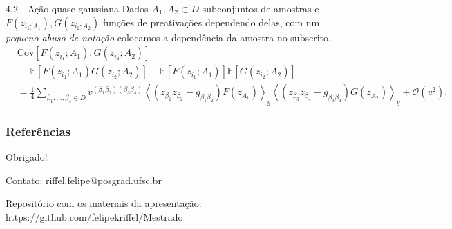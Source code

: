 \documentclass{beamer}
\begin{document}
\begin{frame}{4.2 - Ação quase gaussiana}
    \tiny
    Dados $A_1, A_2 \subset D$ subconjuntos de amostras e $F(z_{i_1;A_1}),G(z_{i_2;A_2})$ funções de preativações dependendo delas, com um \textit{pequeno abuso de notação} colocamos a dependência da amostra no subscrito.
    \begin{align*}
        &\text{Cov}\left[ F(z_{i_1}; A_1), G(z_{i_2}; A_2) \right] \\
        &\equiv \mathbb{E}\left[ F(z_{i_1}; A_1) G(z_{i_2}; A_2) \right] 
        - \mathbb{E}\left[ F(z_{i_1}; A_1) \right] \mathbb{E}\left[ G(z_{i_2}; A_2) \right] \nonumber \\
        &= \frac{1}{4} \sum_{\beta_1, \ldots, \beta_4 \in D} v^{(\beta_1 \beta_2)(\beta_3 \beta_4)} 
        \left\langle (z_{\beta_1} z_{\beta_2} - g_{\beta_1 \beta_2}) F(z_{A_1}) \right\rangle_g 
        \left\langle (z_{\beta_3} z_{\beta_4} - g_{\beta_3 \beta_4}) G(z_{A_2}) \right\rangle_g 
        + \mathcal{O}(v^2).
    \end{align*}

\end{frame}

\begin{frame}
\frametitle{Referências}
\vspace{-2em}
\scriptsize


\end{frame}

\begin{frame}

\begin{center}
\Large Obrigado!
\end{center}

\vspace{1em}
Contato: riffel.felipe@posgrad.ufsc.br 

\vspace{1em}

Repositório com os materiais da apresentação: https://github.com/felipekriffel/Mestrado
    
\end{frame}
\end{document}
